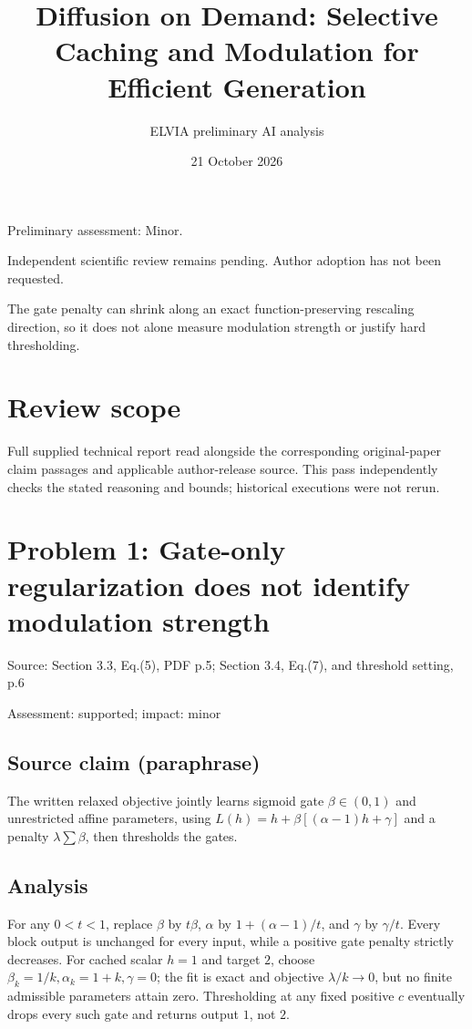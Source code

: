 \documentclass[11pt]{article}
\begin{document}
\title{Diffusion on Demand: Selective Caching and Modulation for Efficient Generation}

\author{ELVIA preliminary AI analysis}\date{21 October 2026}\maketitle

Preliminary assessment: Minor.\par

Independent scientific review remains pending. Author adoption has not been requested.

The gate penalty can shrink along an exact function-preserving rescaling direction, so it does not alone measure modulation strength or justify hard thresholding.

\section*{Review scope}

Full supplied technical report read alongside the corresponding original-paper claim passages and applicable author-release source. This pass independently checks the stated reasoning and bounds; historical executions were not rerun.

\section*{Problem 1: Gate-only regularization does not identify modulation strength}

Source: Section 3.3, Eq.(5), PDF p.5; Section 3.4, Eq.(7), and threshold setting, p.6

Assessment: supported; impact: minor

\subsection*{Source claim (paraphrase)}

The written relaxed objective jointly learns sigmoid gate \(\beta\in(0,1)\) and unrestricted affine parameters, using \(L(h)=h+\beta[(\alpha-1)h+\gamma]\) and a penalty \(\lambda\sum\beta\), then thresholds the gates.

\subsection*{Analysis}

For any \(0<t<1\), replace \(\beta\) by \(t\beta\), \(\alpha\) by \(1+(\alpha-1)/t\), and \(\gamma\) by \(\gamma/t\). Every block output is unchanged for every input, while a positive gate penalty strictly decreases. For cached scalar \(h=1\) and target \(2\), choose \(\beta_k=1/k,\alpha_k=1+k,\gamma=0\); the fit is exact and objective \(\lambda/k\to0\), but no finite admissible parameters attain zero. Thresholding at any fixed positive \(c\) eventually drops every such gate and returns output \(1\), not \(2\).
\end{document}
